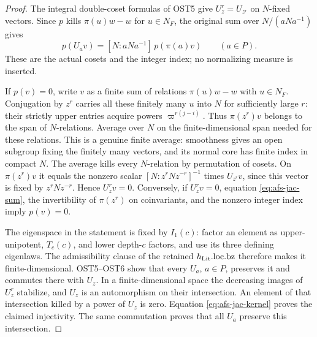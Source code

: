 \begin{proof}
The integral double-coset formulas of OST5 give
$U_z^r=U_{z^r}$ on $N$-fixed vectors.  Since $p$ kills
$\pi(u)w-w$ for $u\in N_F$, the original sum over
$N/(aNa^{-1})$ gives
\begin{equation}\label{eq:afs-jac-sum}
 p(U_av)=[N:aNa^{-1}]\,p(\pi(a)v)\qquad(a\in P).
\end{equation}
These are the actual cosets and the integer index; no
normalizing measure is inserted.

If $p(v)=0$, write $v$ as a finite sum of relations
$\pi(u)w-w$ with $u\in N_F$.  Conjugation by $z^r$ carries
all these finitely many $u$ into $N$ for sufficiently large
$r$: their strictly upper entries acquire powers
$\varpi^{r(j-i)}$.  Thus $\pi(z^r)v$ belongs to the span of
$N$-relations.  Average over $N$ on the finite-dimensional
span needed for these relations.  This is a genuine finite
average: smoothness gives an open subgroup fixing the
finitely many vectors, and its normal core has finite index
in compact $N$.  The average kills every $N$-relation by
permutation of cosets.  On $\pi(z^r)v$ it equals the
nonzero scalar $[N:z^rNz^{-r}]^{-1}$ times $U_{z^r}v$,
since this vector is fixed by $z^rNz^{-r}$.  Hence
$U_z^rv=0$.  Conversely, if $U_z^rv=0$, equation
\eqref{eq:afs-jac-sum}, the invertibility of $\pi(z^r)$ on
coinvariants, and the nonzero integer index imply $p(v)=0$.

The eigenspace in the statement is fixed by $I_1(c)$:
factor an element as upper-unipotent, $T_c(c)$, and lower
depth-$c$ factors, and use its three defining eigenlaws.
The admissibility clause of the retained
$h_{\rm Lit}.\mathrm{loc.bz}$ therefore makes it finite-dimensional.
OST5--OST6 show that every $U_a$, $a\in P$, preserves it
and commutes there with $U_z$.  In a finite-dimensional
space the decreasing images of $U_z^r$ stabilize, and $U_z$
is an automorphism on their intersection.  An element of
that intersection killed by a power of $U_z$ is zero.
Equation \eqref{eq:afs-jac-kernel} proves the claimed
injectivity.  The same commutation proves that all $U_a$
preserve this intersection.
\end{proof}

